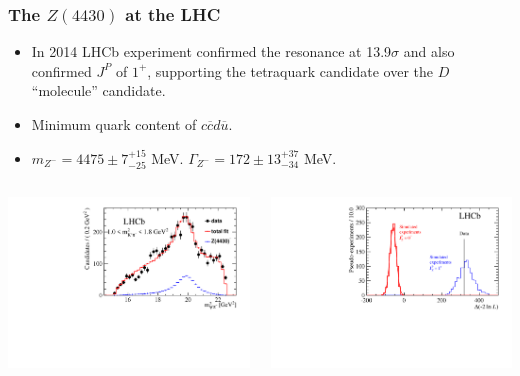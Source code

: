\documentclass[mathserif,18pt,xcolor=table]{beamer}
\begin{document}
\begin{frame}
  \frametitle{The $Z(4430)$ at the LHC}
  \small{
    \begin{itemize}
    \item In 2014 LHCb experiment confirmed the resonance at 13.9$\sigma$ and also confirmed $J^P$ of $1^+$, supporting the tetraquark candidate over the $D$ ``molecule'' candidate.
    \item Minimum quark content of $c\overline{c}d\overline{u}$.
    \item $m_{Z^{-}} = 4475 \pm 7^{+15}_{-25}$ MeV. $\Gamma_{Z^{-}} = 172 \pm 13^{+37}_{-34}$ MeV.
    \end{itemize}
    \begin{center}
      \begin{columns}
        \begin{column}{.5\linewidth}
          \begin{center}
            \includegraphics[width=1\linewidth]{../figures/Z4430_res.pdf}
          \end{center}
        \end{column}
        \begin{column}{.5\linewidth}
          \begin{center}
            \includegraphics[width=1\linewidth]{../figures/Z4430_jp.pdf}

\end{center}
\end{column}
\end{columns}
\end{center}}
\end{frame}
\end{document}
